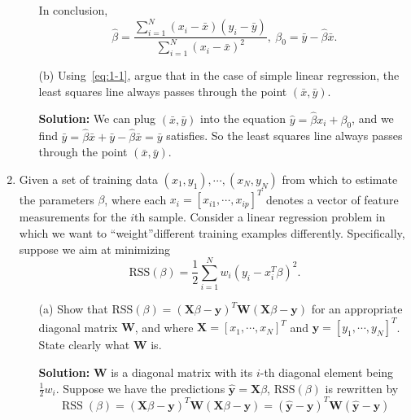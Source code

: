 \documentclass[10pt]{article}
\begin{document}
\begin{enumerate}[1.]
\begin{itemize}
			In conclusion, $$\hat{\beta} = \frac{\sum\limits_{i=1}^{N}(x_i-\bar{x})(y_i-\bar{y})}{\sum\limits_{i=1}^{N}(x_i-\bar{x})^2},\ \hat{\beta_0} = \bar{y}-\hat{\beta}\bar{x}.$$
		

	
			\item[(b)] Using~\eqref{eq:1-1}, argue that in the case of simple linear regression, the least squares line always passes through the point $(\bar{x},\bar{y})$.~
			
			\textbf{Solution:} We can plug $(\bar{x},\bar{y})$ into the equation $\hat{y}=\hat{\beta}x_i+\beta_0$, 
			and we find $\bar{y}=\hat{\beta}\bar{x}+\bar{y}-\hat{\beta}\bar{x}=\bar{y}$ satisfies. So the least squares line always passes through the point $(\bar{x},\bar{y})$.
			


        \end{itemize}
        
        


		\item  Given a set of training data $(x_{1},y_1),\cdots,(x_{N},y_N)$ from which to estimate the parameters $\beta$, 
		where each $x_{i} = \left[x_{i1},\cdots,x_{ip} \right]^{T}$ denotes a vector of feature measurements 
		for the $i$th sample. Consider a linear regression problem in which we want 
		to \textquotedblleft weight\textquotedblright different training examples differently. Specifically, suppose we aim at minimizing
        \begin{equation}\label{eq: 2-1}
        	\textrm{RSS}(\beta) = \frac{1}{2}\sum_{i=1}^{N}w_{i}(y_{i} -x_{i}^{T}\beta)^{2}.
        \end{equation}
        \begin{itemize}
        	\item[(a)] Show that $\textrm{RSS}(\beta) = (\mathbf{X}\beta - \mathbf{y})^{T}\mathbf{W}(\mathbf{X}\beta-\mathbf{y})$
			for an appropriate diagonal matrix $\mathbf{W}$, and where $\mathbf{X} = \left[x_{1},\cdots,x_{N} \right]^{T}$ 
			and $\mathbf{y} = \left[y_1,\cdots,y_N \right]^{T}$. State clearly what $\mathbf{W}$ is. ~
        	
        	
			\textbf{Solution:} $\mathbf{W}$ is a diagonal matrix with its $i$-th diagonal element being $\frac{1}{2}w_i$. 
			Suppose we have the predictions $\hat{\boldsymbol{y}}=\mathbf{X} \beta$, $\textrm{RSS}(\beta)$ is rewritten by
			$$\operatorname{RSS}(\beta)=(\mathbf{X} \beta-\mathbf{y})^{T} \mathbf{W}(\mathbf{X} \beta-\mathbf{y})=(\mathbf{\hat{y}}-\mathbf{y})^T
			\mathbf{W}(\mathbf{\hat{y}}-\mathbf{y})$$
        	

\end{itemize}
\end{enumerate}
\end{document}
